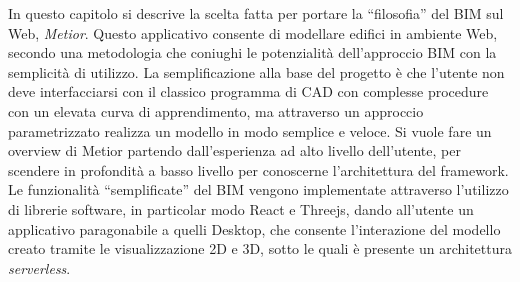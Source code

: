 In questo capitolo si descrive la scelta fatta per portare la ``filosofia'' del BIM sul Web, \emph{Metior}.
Questo applicativo consente di modellare edifici in ambiente Web, secondo una metodologia che coniughi le potenzialità
dell’approccio BIM con la semplicità di utilizzo.
La semplificazione alla base del progetto è che l'utente non deve interfacciarsi con il classico programma
di CAD con complesse procedure con un elevata curva di apprendimento, ma attraverso un approccio parametrizzato
realizza un modello in modo semplice e veloce.
Si vuole fare un overview di Metior partendo dall'esperienza ad alto livello dell'utente, per scendere in profondità
a basso livello per conoscerne l'architettura del framework.
Le funzionalità ``semplificate'' del BIM vengono implementate attraverso l'utilizzo di librerie software,
in particolar modo React e Threejs, dando all'utente un applicativo paragonabile a quelli
Desktop, che consente l'interazione del modello creato tramite le visualizzazione 2D e 3D, sotto le quali
è presente un architettura \emph{serverless}.
\newpage
